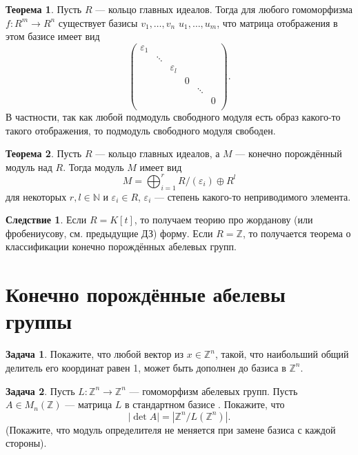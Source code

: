 \documentclass[10pt,a4paper,oneside]{book}
\theoremstyle{definition}
\newtheorem{zad}{Задача}
\newtheorem*{thmm}{Теорема}
\newtheorem{cor}{Следствие}
\newcommand{\mb}[1]{\mathbb{#1}}
\def\eps{\varepsilon}
\begin{document}
\begin{thmm}
Пусть $R$ --- кольцо главных идеалов. Тогда для любого гомоморфизма $f\colon R^m\to R^n$ существует базисы $v_1, \dots, v_n$ $u_1,\dots, u_m$, что матрица отображения в этом базисе имеет вид
$$\begin{pmatrix}
\eps_1& & & & & \\
& \ddots& & & &\\
& &  \eps_l& & & \\
&  & & 0& & \\
&& & &\ddots & \\
& & & & & 0\\
\end{pmatrix}.$$
В частности, так как любой подмодуль свободного модуля есть образ какого-то такого отображения, то подмодуль свободного модуля свободен.
\end{thmm}

\begin{thmm}
Пусть $R$ --- кольцо главных идеалов, а $M$ --- конечно порождённый модуль над $R$.  Тогда модуль $M$ имеет вид 
$$M=\bigoplus_{i=1}^r R/(\eps_i)\oplus R^{l}$$
для некоторых $r,l\in \mb N$ и $\eps_i\in R$, $\eps_i$ --- степень какого-то неприводимого элемента.
\end{thmm}

\begin{cor}
Если $R=K[t]$, то получаем теорию про жорданову (или фробениусову, см. предыдущие ДЗ) форму. Если $R=\mb Z$, то получается теорема о классификации конечно порождённых абелевых групп.
\end{cor}








\section{Конечно порождённые абелевы группы}

\begin{zad} Покажите, что любой вектор из $x\in \mb Z^n$, такой, что наибольший общий делитель его координат равен 1, может быть дополнен до базиса в $\mb Z^n$.
\end{zad}

\begin{zad} Пусть $L\colon \mb Z^n \to \mb Z^n$ --- гомоморфизм абелевых групп. Пусть $A\in M_n(\mb Z)$ --- матрица $L$ в стандартном базисе . Покажите, что 
$$|\det A|= |\mb Z^n/L(\mb Z^n)|.$$
(Покажите, что модуль определителя не меняется при замене базиса с каждой стороны).
\end{zad}
\end{document}
